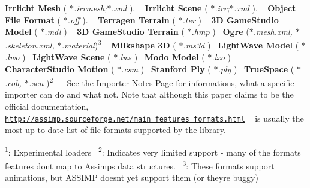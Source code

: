 { {\bfseries Irrlicht Mesh } ( {\itshape $\ast$.irrmesh;$\ast$.xml} ). ~\newline
 {\bfseries Irrlicht Scene } ( {\itshape $\ast$.irr;$\ast$.xml} ). ~\newline
 {\bfseries Object File Format } ( {\itshape $\ast$.off} ). ~\newline
 {\bfseries Terragen Terrain } ( {\itshape $\ast$.ter} ) ~\newline
 {\bfseries 3\+D Game\+Studio Model } ( {\itshape $\ast$.mdl} ) ~\newline
 {\bfseries 3\+D Game\+Studio Terrain} ( {\itshape $\ast$.hmp} )~\newline
 {\bfseries Ogre} ({\itshape $\ast$.mesh.\+xml, $\ast$.skeleton.\+xml, $\ast$.material})\textsuperscript{3} ~\newline
 {\bfseries Milkshape 3\+D} ( {\itshape $\ast$.ms3d} )~\newline
 {\bfseries Light\+Wave Model} ( {\itshape $\ast$.lwo} )~\newline
 {\bfseries Light\+Wave Scene} ( {\itshape $\ast$.lws} )~\newline
 {\bfseries Modo Model} ( {\itshape $\ast$.lxo} )~\newline
 {\bfseries Character\+Studio Motion} ( {\itshape $\ast$.csm} )~\newline
 {\bfseries Stanford Ply} ( {\itshape $\ast$.ply} )~\newline
 {\bfseries True\+Space} ( {\itshape $\ast$.cob, $\ast$.scn} )\textsuperscript{2}~\newline
~\newline
 } See the \hyperlink{importer_notes}{Importer Notes Page } for informations, what a specific importer can do and what not. Note that although this paper claims to be the official documentation, \href{http://assimp.sourceforge.net/main_features_formats.html}{\tt http\+://assimp.\+sourceforge.\+net/main\+\_\+features\+\_\+formats.\+html} ~\newline
is usually the most up-\/to-\/date list of file formats supported by the library. ~\newline


\textsuperscript{1}\+: Experimental loaders~\newline
 \textsuperscript{2}\+: Indicates very limited support -\/ many of the format\textquotesingle{}s features don\textquotesingle{}t map to Assimp\textquotesingle{}s data structures.~\newline
 \textsuperscript{3}\+: These formats support animations, but A\+S\+S\+I\+M\+P doesn\textquotesingle{}t yet support them (or they\textquotesingle{}re buggy)~\newline
 ~\newline
 



